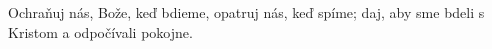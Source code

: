 Ochraňuj nás, Bože, keď bdieme, opatruj nás, keď spíme; daj, aby sme bdeli s Kristom a odpočívali pokojne.
